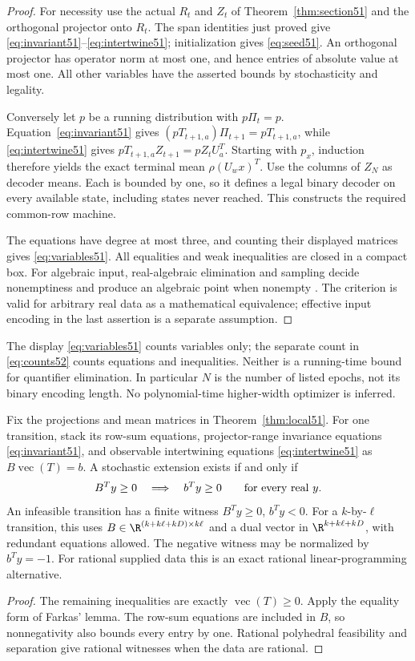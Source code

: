 \begin{proof}
For necessity use the actual $R_t$ and $Z_t$ of
Theorem~\ref{thm:section51} and the orthogonal projector onto $R_t$.
The span identities just proved give
\eqref{eq:invariant51}--\eqref{eq:intertwine51}; initialization gives
\eqref{eq:seed51}. An orthogonal projector has operator norm at most
one, and hence entries of absolute value at most one. All other
variables have the asserted bounds by stochasticity and legality.

Conversely let $p$ be a running distribution with $p\Pi_t=p$.
Equation~\eqref{eq:invariant51} gives
$(pT_{t+1,a})\Pi_{t+1}=pT_{t+1,a}$, while
\eqref{eq:intertwine51} gives
$pT_{t+1,a}Z_{t+1}=pZ_tU_a^T$. Starting with $p_x$, induction
therefore yields the exact terminal mean $\rho(U_wx)^T$. Use the
columns of $Z_N$ as decoder means. Each is bounded by one, so it
defines a legal binary decoder on every available state, including
states never reached. This constructs the required common-row machine.

The equations have degree at most three, and counting their displayed
matrices gives \eqref{eq:variables51}. All equalities and weak
inequalities are closed in a compact box. For algebraic input,
real-algebraic elimination and sampling decide nonemptiness and produce
an algebraic point when nonempty \cite{BPR}. The criterion is valid for
arbitrary real data as a mathematical equivalence; effective input
encoding in the last assertion is a separate assumption.
\end{proof}

The display \eqref{eq:variables51} counts variables only; the separate
count in \eqref{eq:counts52} counts equations and inequalities. Neither
is a running-time bound for quantifier elimination. In particular $N$ is the
number of listed epochs, not its binary encoding length. No
polynomial-time higher-width optimizer is inferred.

\begin{proposition}\label{prop:dual51}
Fix the projections and mean matrices in
Theorem~\ref{thm:local51}. For one transition, stack its row-sum equations, projector-range invariance equations
\eqref{eq:invariant51}, and observable intertwining equations
\eqref{eq:intertwine51} as $B\operatorname{vec}(T)=b$. A stochastic
extension exists if and only if
\[
 B^Ty\ge0\quad\Longrightarrow\quad b^Ty\ge0
 \qquad\hbox{for every real }y.
\]
An infeasible transition has a finite witness $B^Ty\ge0$, $b^Ty<0$.
For a $k$-by-$\ell$ transition, this uses
$B\in\R^{(k+k\ell+kD)\times k\ell}$ and a dual vector in
$\R^{k+k\ell+kD}$, with redundant equations allowed. The negative
witness may be normalized by $b^Ty=-1$. For rational supplied data
this is an exact rational linear-programming alternative.
\end{proposition}
\begin{proof}
The remaining inequalities are exactly
$\operatorname{vec}(T)\ge0$. Apply the equality form of Farkas'
lemma. The row-sum equations are included in $B$, so nonnegativity
also bounds every entry by one. Rational polyhedral feasibility and
separation give rational witnesses when the data are rational.
\end{proof}

